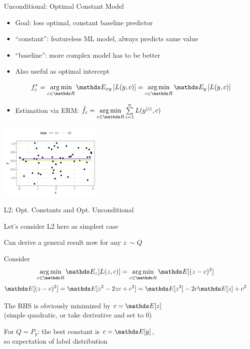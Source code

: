 \documentclass[11pt,compress,t,notes=noshow, xcolor=table]{beamer}
\begin{document}
\begin{vbframe}{Unconditional: Optimal Constant Model}

\begin{itemize}
\item Goal: loss optimal, constant baseline predictor
\item ``constant'': featureless ML model, always predicts same value
\item ``baseline'': more complex model has to be better 
\item Also useful as optimal intercept


$$f_{c}^{\ast} = \argmin_{c \in \R} \E_{xy} \left[L(y,c)\right] = \argmin_{c \in \R} \E_{y} \left[L(y,c)\right]$$

\item Estimation via ERM: $\hat{f}_c = \argminlim_{c \in \R} \sumin L(\yi,c)$

\end{itemize}

\vspace*{-0.2cm}

\begin{center}
	\includegraphics[width = 0.38\textwidth]{figure/l1_vs_l2.png}
\end{center}
\end{vbframe}


\begin{vbframe}{L2: Opt. Constants and Opt. Unconditional}

\begin{itemizeM}
\item Let's consider L2 here as simplest case
\item Can derive a general result now for any $z ~ \sim Q$
\item Consider 
$$ 
\argmin_{c \in \R}  \E_{z} [L(z, c)] = \argmin_{c \in \R}  \E [(z - c)^2] 
$$
$$
\E [(z - c)^2] =  \E [z^2 - 2zc + c^2 ] = \E[z^2] -2c\E[z] + c^2   
$$

\item The RHS is obviously minimized by $c = \E[z]$\\
(simple quadratic, or take derivative and set to 0)


\item For $Q = P_y$: the best constant is $c = \E[y]$, \\
so expectation of label distribution

\end{itemizeM}
\end{vbframe}
\end{document}
